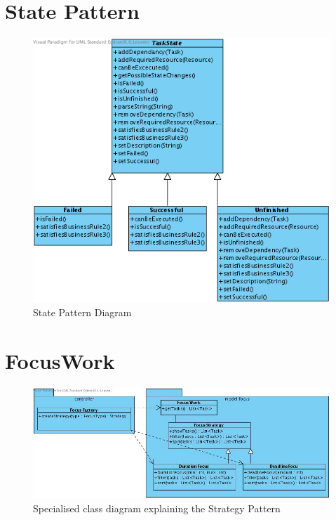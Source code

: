 	\newpage
	\appendix
	\section{State Pattern}
	\begin{figure}[H]
		\begin{center}
			\includegraphics[scale=0.6]{images/State_Pattern.png}
		\end{center}
		\caption{State Pattern Diagram}
	\end{figure}
	\section{FocusWork}
	\begin{figure}[H]
		\begin{center}
			\includegraphics[scale=0.5]{images/focus_class_diagram.jpg}
		\end{center}
		\caption{Specialised class diagram explaining the Strategy Pattern}
	\end{figure}
